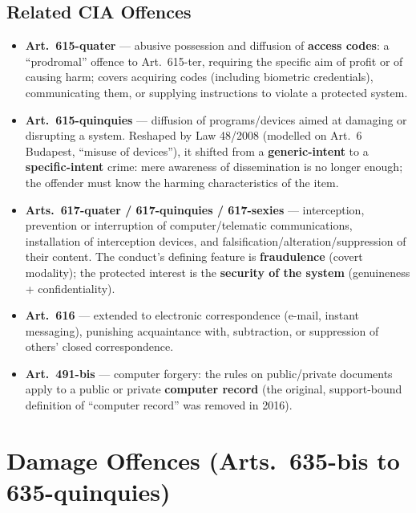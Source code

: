 \documentclass[11pt,a4paper,openany]{report}
\theoremstyle{definition}
\theoremstyle{plain}
\theoremstyle{remark}
\begin{document}
\subsection{Related CIA Offences}

\begin{itemize}
    \item \textbf{Art.\ 615-quater} --- abusive possession and diffusion of \textbf{access codes}: a ``prodromal'' offence to Art.\ 615-ter, requiring the specific aim of profit or of causing harm; covers acquiring codes (including biometric credentials), communicating them, or supplying instructions to violate a protected system.
    \item \textbf{Art.\ 615-quinquies} --- diffusion of programs/devices aimed at damaging or disrupting a system. Reshaped by Law 48/2008 (modelled on Art.\ 6 Budapest, ``misuse of devices''), it shifted from a \textbf{generic-intent} to a \textbf{specific-intent} crime: mere awareness of dissemination is no longer enough; the offender must know the harming characteristics of the item.
    \item \textbf{Arts.\ 617-quater / 617-quinquies / 617-sexies} --- interception, prevention or interruption of computer/telematic communications, installation of interception devices, and falsification/alteration/suppression of their content. The conduct's defining feature is \textbf{fraudulence} (covert modality); the protected interest is the \textbf{security of the system} (genuineness + confidentiality).
    \item \textbf{Art.\ 616} --- extended to electronic correspondence (e-mail, instant messaging), punishing acquaintance with, subtraction, or suppression of others' closed correspondence.
    \item \textbf{Art.\ 491-bis} --- computer forgery: the rules on public/private documents apply to a public or private \textbf{computer record} (the original, support-bound definition of ``computer record'' was removed in 2016).
\end{itemize}

\section{Damage Offences (Arts.\ 635-bis to 635-quinquies)}
\end{document}
